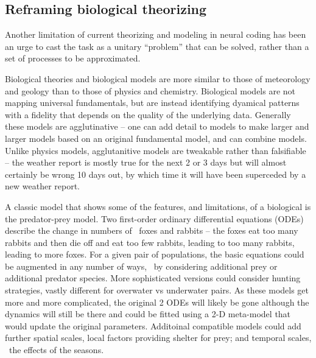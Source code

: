 \documentclass[12pt]{article}
\begin{document}
\subsection*{Reframing biological theorizing}

Another limitation of current theorizing and modeling in neural coding has been an urge to cast the task as a unitary ``problem'' that can be solved,\cite{Marr1977-yh,Marr1982-st}
rather than a set of processes to be approximated.

Biological theories and biological models are more similar to those of meteorology and geology than to those of physics and chemistry.\cite{Mulugeta2018-kc,Hunt2018-pq}
Biological models are not mapping universal fundamentals, but
are instead identifying dyamical patterns with a fidelity that depends on the quality of the underlying data. Generally these models are agglutinative -- one can add
detail to models to make larger and larger models based on an original fundamental model, and can combine models. Unlike physics models, agglutanitive models are tweakable
rather than falsifiable -- the weather report is mostly true for the next 2 or 3 days but will almost certainly be wrong 10 days out, by which time it will have been superceded
by a new weather report.

A classic model that shows some of the features, and limitations, of a biological is the predator-prey model. Two first-order ordinary differential equations (ODEs)
describe the change in numbers of \eg\ foxes and rabbits -- the foxes eat too many rabbits and then die off and eat too few rabbits, leading to too many rabbits, leading to
more foxes. For a given pair of populations, the basic equations could be augmented in any number of ways, \eg\ by considering additional prey or additional predator species.
More sophisticated versions could consider hunting strategies, vastly different for overwater vs underwater pairs. As these models get more
and more complicated, the original 2 ODEs will likely be gone although the dynamics will still be there and could be fitted using a 2-D meta-model that would update the
original parameters. Additoinal compatible models could add further spatial scales, local factors providing shelter for prey; and temporal scales, \eg\ the effects of the seasons.

\end{document}
